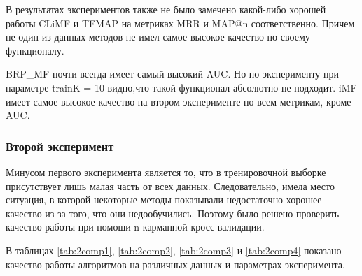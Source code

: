 \documentclass[14pt]{extarticle}
\begin{document}
 В результатах экспериментов также не  было замечено какой-либо хорошей работы CLiMF и TFMAP на метриках MRR и MAP@n соответственно. Причем не один из данных методов не имел самое высокое качество по своему функционалу. 
 
 BRP\_MF почти всегда имеет самый высокий AUC. Но по  эксперименту при параметре trainK = 10 видно,что такой функционал абсолютно не подходит. iMF имеет самое высокое качество на втором эксперименте по всем метрикам, кроме AUC. 

\subsubsection{Второй эксперимент}
 Минусом первого эксперимента является то, что в тренировочной выборке присутствует лишь малая часть от всех данных. Следовательно, имела место ситуация, в которой некоторые методы показывали недостаточно хорошее качество из-за того, что они недообучились.   Поэтому было решено проверить качество работы при помощи n-карманной кросс-валидации. 
 
 В таблицах \ref{tab:2comp1}, \ref{tab:2comp2}, \ref{tab:2comp3} и \ref{tab:2comp4} показано качество работы алгоритмов на различных данных и параметрах эксперимента.
 
\begin{table}[H]
\caption{Набор данных MovieLens 100k}
\label{tab:2comp1}
\end{table}
\end{document}
